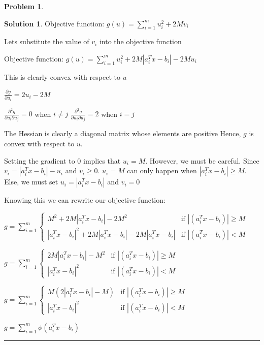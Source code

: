 \documentclass{article}
\theoremstyle{definition}
\newtheorem{problem}{Problem}
\def\fline{\rule{0.75\linewidth}{0.5pt}}
\newcommand{\finishline}{\begin{center}\fline\end{center}}
\newtheorem*{solution*}{Solution}
\newenvironment{solution}{\begin{solution*}}{{\finishline} \end{solution*}}
\begin{document}
\begin{problem}
\begin{solution}
Objective function: $g(u) = \sum_{i=1}^{m} u_i^2 + 2Mv_i$ \newline 

Lets substitute the value of $v_i$ into the objective function \newline


    Objective function: $g(u) = \sum_{i=1}^{m} u_i^2 + 2M|a_i^T x - b_i| - 2Mu_i$ \newline

    This is clearly convex with respect to $u$ \newline 

    $\frac{\partial g}{\partial u_i} = 2u_i - 2M$

    $\frac{\partial^2 g}{\partial u_i \partial u_j} = 0$ when $i \neq j$ \newline 
    $\frac{\partial^2 g}{\partial u_i \partial u_j} = 2$ when $i = j$

    The Hessian is clearly a diagonal matrix whose elements are positive Hence, $g$ is convex with respect to $u$. 

    Setting the gradient to 0 implies that $u_i = M$. However, we must be careful. Since $v_i = |a_i^T x - b_i| - u_i$ and $v_i \geq 0$. $u_i = M$ can only happen when $|a_i^T x - b_i| \geq M$. Else, we must set $u_i = |a_i^T x - b_i|$ and $v_i = 0$

    Knowing this we can rewrite our objective function: 

$g = \sum_{i=1}^{m} \begin{cases} 
      M^2 + 2M|a_i^T x - b_i| - 2M^2  & \text{if }  |(a_i^T x - b_i)| \geq M \\
      |a_i^T x - b_i|^2 + 2M|a_i^T x - b_i| - 2M|a_i^T x - b_i| & \text{if } |(a_i^T x - b_i)| < M
   \end{cases}$ \newline 

$g = \sum_{i=1}^{m} \begin{cases} 
      2M|a_i^T x - b_i| - M^2  & \text{if }  |(a_i^T x - b_i)| \geq M \\
      |a_i^T x - b_i|^2  & \text{if } |(a_i^T x - b_i)| < M
   \end{cases}$ \newline 

$g = \sum_{i=1}^{m} \begin{cases} 
      M(2|a_i^T x - b_i| - M)  & \text{if }  |(a_i^T x - b_i)| \geq M \\
      |a_i^T x - b_i|^2  & \text{if } |(a_i^T x - b_i)| < M
   \end{cases}$ \newline 

$g = \sum_{i=1}^{m} \phi(a_i^T x - b_i)$ \newline 

\end{solution}
\end{problem}
\end{document}
